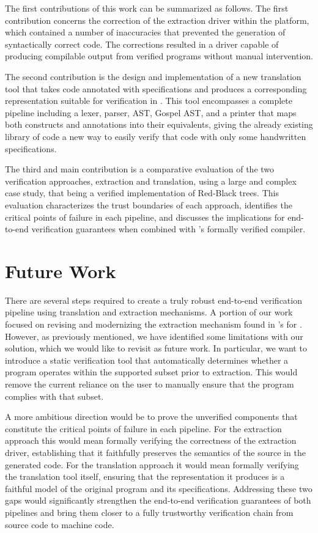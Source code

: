 The first contributions of this work can be summarized as follows. The first contribution concerns the correction of the \cml extraction driver within the \whythree platform, which contained a 
number of inaccuracies that prevented the generation of syntactically correct \cml code. The corrections resulted in a driver capable of producing compilable \cml output from verified \whyml programs 
without manual intervention.

The second contribution is the design and implementation of a new translation tool that takes \cml code annotated with \gospel specifications and produces a corresponding \whyml representation suitable 
for verification in \whythree. This tool encompasses a complete pipeline including a lexer, parser, AST, Gospel AST, and a printer that maps both \cml constructs and \gospel annotations into their 
\whyml equivalents, giving the already existing \cml library of code a new way to easily verify that code with only some handwritten specifications.

The third and main contribution is a comparative evaluation of the two verification approaches, extraction and translation, using a large and complex case study, that being a verified implementation
of Red-Black trees. This evaluation characterizes the trust boundaries of each approach, identifies the critical points of failure in each pipeline, and discusses the implications for end-to-end 
verification guarantees when combined with \cml's formally verified compiler.

\section{Future Work}

There are several steps required to create a truly robust end-to-end verification pipeline using translation and extraction mechanisms. A portion of our work focused on revising and modernizing
the extraction mechanism found in \whythree's for \cml. However, as previously mentioned, we have identified some limitations with our solution, which we would like to revisit as future work. In
particular, we want to introduce a static verification tool that automatically determines whether a \whyml program operates within the supported subset prior to extraction. This would remove
the current reliance on the user to manually ensure that the \whyml program complies with that subset.

A more ambitious direction would be to prove the unverified components that constitute the critical points of failure in each pipeline. For the extraction approach this would 
mean formally verifying the correctness of the \cml extraction driver, establishing that it faithfully preserves the semantics of the \whyml source in the generated \cml code. For the translation 
approach it would mean formally verifying the translation tool itself, ensuring that the \whyml representation it produces is a faithful model of the original \cml program and its \gospel 
specifications. Addressing these two gaps would significantly strengthen the end-to-end verification guarantees of both pipelines and bring them closer to a fully trustworthy verification 
chain from source code to machine code.